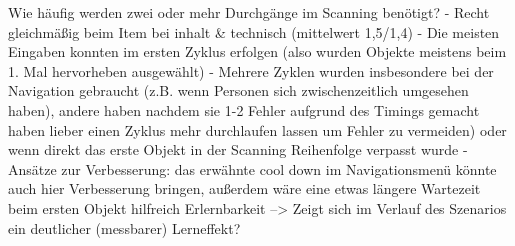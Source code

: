 Wie häufig werden zwei oder mehr Durchgänge im Scanning benötigt?
-	Recht gleichmäßig beim Item bei inhalt \& technisch (mittelwert 1,5/1,4)
-	Die meisten Eingaben konnten im ersten Zyklus erfolgen (also wurden Objekte meistens beim 1. Mal hervorheben ausgewählt) 
-	Mehrere Zyklen wurden insbesondere bei der Navigation gebraucht (z.B. wenn Personen sich zwischenzeitlich umgesehen haben), andere haben nachdem sie 1-2 Fehler aufgrund des Timings gemacht haben lieber einen Zyklus mehr durchlaufen lassen um Fehler zu vermeiden) oder wenn direkt das erste Objekt in der Scanning Reihenfolge verpasst wurde 
-	Ansätze zur Verbesserung: das erwähnte cool down im Navigationsmenü könnte auch hier Verbesserung bringen, außerdem wäre eine etwas längere Wartezeit beim ersten Objekt hilfreich
Erlernbarkeit
-->	Zeigt sich im Verlauf des Szenarios ein deutlicher (messbarer) Lerneffekt? 

